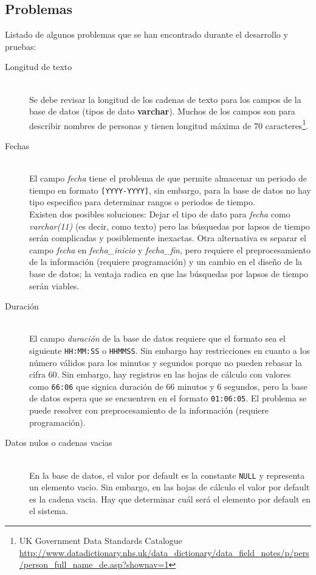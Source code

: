 \documentclass[10pt,letterpaper]{article}
\begin{document}
\subsection{Problemas}
Listado de algunos problemas que se han encontrado durante el desarrollo y pruebas:
\begin{description}
	\item[Longitud de texto] \hfill \\
		Se debe revisar la longitud de los cadenas de texto para los campos de la base de datos (tipos de dato \textbf{varchar}). Muchos de los campos son para describir nombres de personas y tienen longitud máxima de 70 caracteres\footnote{UK Government Data Standards Catalogue \url{http://www.datadictionary.nhs.uk/data_dictionary/data_field_notes/p/pers/person_full_name_de.asp?shownav=1}}.
	\item[Fechas] \hfill \\
		El campo \textit{fecha} tiene el problema de que permite almacenar un periodo de tiempo en formato \verb|[YYYY-YYYY]|, sin embargo, para la base de datos no hay tipo especifico para determinar rangos o periodos de tiempo. \\
		Existen dos posibles soluciones: Dejar el tipo de dato para \textit{fecha} como \textit{varchar(11)} (es decir, como texto) pero las búsquedas por lapsos de tiempo serán complicadas y posiblemente inexactas. Otra alternativa es separar el campo \textit{fecha} en \textit{fecha\_inicio} y \textit{fecha\_fin}, pero requiere el preprocesamiento de la información (requiere programación) y un cambio en el diseño de la base de datos; la ventaja radica en que las búsquedas por lapsos de tiempo serán viables.
	\item[Duración] \hfill \\
		El campo \textit{duración} de la base de datos requiere que el formato sea el siguiente \verb|HH:MM:SS| o \verb|HHMMSS|. Sin embargo hay restricciones en cuanto a los número válidos para los minutos y segundos porque no pueden rebasar la cifra 60. Sin embargo, hay registros en las hojas de cálculo con valores como \verb|66:06| que signica duración de 66 minutos y 6 segundos, pero la base de datos espera que se encuentren en el formato \verb|01:06:05|. El problema se puede resolver con preprocesamiento de la información (requiere programación).
	\item[Datos nulos o cadenas vacias] \hfill \\
		En la base de datos, el valor por default es la constante \verb|NULL| y representa un elemento vacio. Sin embargo, en las hojas de cálculo el valor por default es la cadena vacia. Hay que determinar cuál será el elemento por default en el sistema.
\end{description}
\end{document}
